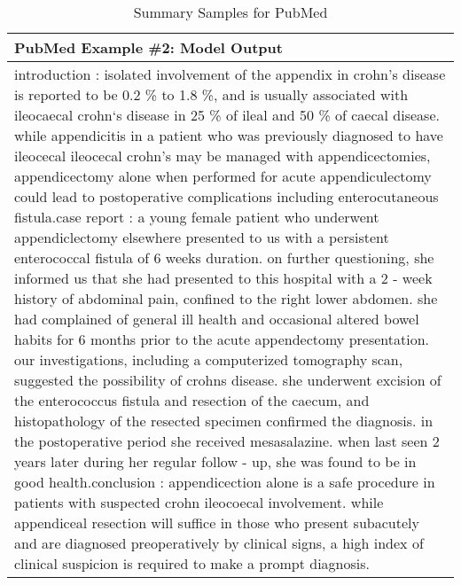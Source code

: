 \documentclass{article} \usepackage{iclr2022_conference,times}
\begin{document}
\begin{table}[!htbp]
\begin{tabular}{p{\linewidth}}
    \\
    \midrule
    \textbf{PubMed Example \#2: Model Output} \\
    \midrule
introduction : isolated involvement of the appendix in crohn's disease is reported to be 0.2 \% to 1.8 \%, and is usually associated with ileocaecal crohn`s disease in 25 \% of ileal and 50 \% of caecal disease. while appendicitis in a patient who was previously diagnosed to have ileocecal ileocecal crohn's may be managed with appendicectomies, appendicectomy alone when performed for acute appendiculectomy could lead to postoperative complications including enterocutaneous fistula.case report : a young female patient who underwent appendiclectomy elsewhere presented to us with a persistent enterococcal fistula of 6 weeks duration. on further questioning, she informed us that she had presented to this hospital with a 2 - week history of abdominal pain, confined to the right lower abdomen. she had complained of general ill health and occasional altered bowel habits for 6 months prior to the acute appendectomy presentation. our investigations, including a computerized tomography scan, suggested the possibility of crohns disease. she underwent excision of the enterococcus fistula and resection of the caecum, and histopathology of the resected specimen confirmed the diagnosis. in the postoperative period she received mesasalazine. when last seen 2 years later during her regular follow - up, she was found to be in good health.conclusion : appendicection alone is a safe procedure in patients with suspected crohn ileocoecal involvement. while appendiceal resection will suffice in those who present subacutely and are diagnosed preoperatively by clinical signs, a high index of clinical suspicion is required to make a prompt diagnosis.    \\
    \bottomrule
    \end{tabular}
    \caption{
    Summary Samples for PubMed
    }
\end{table}
\end{document}

